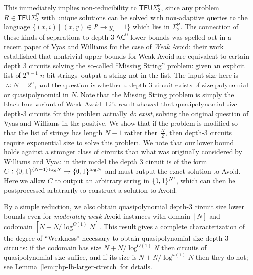 This immediately implies non-reducibility to $\mathsf{TFU\Sigma_2^P}$, since any problem $R \in \mathsf{TFU\Sigma_2^P}$ with unique solutions can be solved with non-adaptive queries to the language $\{(x,i) \mid (x,y) \in R \rightarrow y_i=1\}$ which lies in $\mathsf{\Sigma_2^P}$. The connection of these kinds of separations to depth 3 $\mathsf{AC}^0$ lower bounds was spelled out in a recent paper of Vyas and Williams \cite{vyas-williams} for the case of \emph{Weak} Avoid: their work established that nontrivial upper bounds for Weak Avoid are equivalent to certain depth 3 circuits solving the so-called ``Missing String'' problem: given an explicit list of $2^{n-1}$ $n$-bit strings, output a string not in the list. The input size here is $\approx N=2^n$, and the question is whether a depth 3 circuit exists of size polynomial or quasipolynomial in $N$. Note that the Missing String problem is simply the black-box variant of Weak Avoid. Li's result showed that quasipolynomial size depth-3 circuits for this problem actually \emph{do exist}, solving the original question of Vyas and Williams in the positive. We show that if the problem is modified so that the list of strings has length $N-1$ rather then $\frac{N}{2}$, then depth-3 circuits require exponential size to solve this problem. We note that our lower bound holds against a stronger class of circuits than what was originally considered by Williams and Vyas: in their model the depth 3 circuit is of the form $ C:\{0,1\}^{(N-1) \log N } \to \{0,1\}^{ \log N}$ and must output the exact solution to Avoid. Here we allow $C$ to output an arbitrary string in $\{0,1\}^{N^{\epsilon}}$, which can then be postprocessed arbitrarily to construct a solution to Avoid.

By a simple reduction, we also obtain quasipolynomial depth-3 circuit size lower bounds even for \emph{moderately weak} Avoid instances with domain $[N]$ and codomain $[N + N/\log^{O(1)} N]$. This result gives a complete characterization of the degree of ``Weakness'' necessary to obtain quasipolynomial size depth 3 circuits: if the codomain has size $N + N/\log^{O(1)} N$ then circuits of quasipolynomial size suffice, and if its size is $N + N/\log^{\omega(1)}N$ then they do not; see Lemma~\ref{lem:php-lb-larger-stretch} for details.


